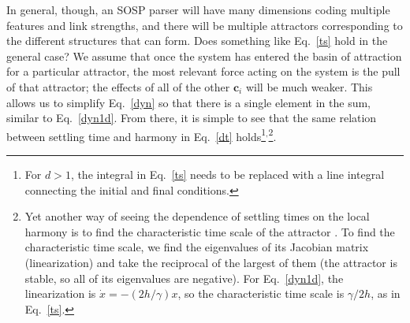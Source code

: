 \documentclass[10pt,letterpaper]{article}
\begin{document}
In general, though, an SOSP parser will have many dimensions coding multiple features and link strengths, and there will be multiple attractors corresponding to the different structures that can form. Does something like Eq.~\ref{ts} hold in the general case? We assume that once the system has entered the basin of attraction for a particular attractor, the most relevant force acting on the system is the pull of that attractor; the effects of all of the other $\mathbf{c}_i$ will be much weaker. This allows us to simplify Eq.~\ref{dyn} so that there is a single element in the sum, similar to Eq.~\ref{dyn1d}. From there, it is simple to see that the same relation between settling time and harmony in Eq.~\ref{dt} holds\footnote{For $d > 1$, the integral in Eq.~\ref{ts} needs to be replaced with a line integral connecting the initial and final conditions.}$^,$\footnote{Yet another way of seeing the dependence of settling times on the local harmony is to find the characteristic time scale of the attractor \cite{strogatz1994nonlinear}. To find the characteristic time scale, we find the eigenvalues of its Jacobian matrix (linearization) and take the reciprocal of the largest of them (the attractor is stable, so all of its eigenvalues are negative). For Eq.~\ref{dyn1d}, the linearization is $\dot{x} = -(2h/\gamma)x$, so the characteristic time scale is $\gamma / 2h$, as in Eq.~\ref{ts}.}.

\end{document}
